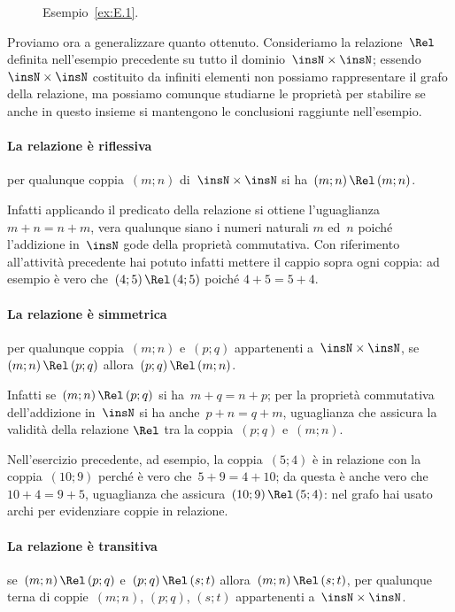  \begin{figure}[hb]
  \centering
 \caption{Esempio~\ref{ex:E.1}.}\label{fig:E.1}
 \end{figure}

Proviamo ora a generalizzare quanto ottenuto.
Consideriamo la relazione~$\Rel$ definita nell'esempio precedente su tutto il dominio~$\insN\times\insN$; essendo~$\insN\times\insN$
costituito da infiniti elementi non possiamo rappresentare il grafo della relazione, ma possiamo comunque studiarne le proprietà per
stabilire se anche in questo insieme si mantengono le conclusioni raggiunte nell'esempio.

\paragraph{La relazione è riflessiva} per qualunque coppia~$(m;n)$ di~$\insN\times\insN$ si ha~$(m;n) \,\Rel\, (m;n)$.

Infatti applicando il predicato della relazione si ottiene l'uguaglianza~$m+n = n+m$, vera qualunque siano i numeri naturali
$m$ ed~$n$ poiché l'addizione in~$\insN$ gode della proprietà commutativa. Con riferimento all'attività precedente hai potuto infatti
mettere il cappio sopra ogni coppia: ad esempio è vero che~$(4;5) \,\Rel\, (4;5)$ poiché $4+5 = 5+4$.

\paragraph{La relazione è simmetrica} per qualunque coppia~$(m;n)$ e~$(p;q)$ appartenenti a~$\insN\times\insN$, se~$(m;n)\,\Rel\,(p;q)$ allora~$(p;q)\,\Rel\, (m;n)$.

Infatti se~$(m;n)\,\Rel\,(p;q)$ si ha~$m+q = n+p$; per la proprietà commutativa dell'addizione in~$\insN$ si ha anche~$p+n=q+m$,
uguaglianza che assicura la validità della relazione $\Rel$ tra la coppia~$(p;q)$ e~$(m;n)$.

Nell'esercizio precedente, ad esempio, la coppia~$(5;4)$ è in relazione con la coppia~$(10;9)$ perché è vero che~$5+9 = 4+10$;
da questa è anche vero che~$10+4 = 9+5$,
uguaglianza che assicura~$(10;9)\,\Rel\,(5;4)$: nel grafo hai usato archi per evidenziare coppie in relazione.

\paragraph{La relazione è transitiva} se~$(m;n)\,\Rel\,(p;q)$ e~$(p;q)\,\Rel\,(s;t)$ allora~$(m;n)\,\Rel\,(s;t)$,
per qualunque terna di coppie~$(m;n)$, $(p;q)$, $(s;t)$ appartenenti a~$\insN\times\insN$.

